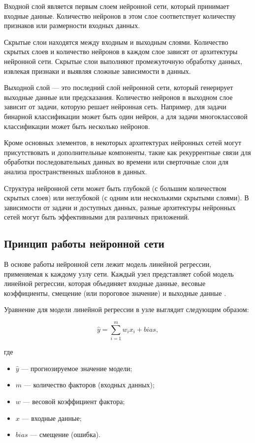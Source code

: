 Входной слой является первым слоем нейронной сети, который принимает входные данные. Количество нейронов в этом слое соответствует количеству признаков или размерности входных данных.

Скрытые слои находятся между входным и выходным слоями. Количество скрытых слоев и количество нейронов в каждом слое зависят от архитектуры нейронной сети. Скрытые слои выполняют промежуточную обработку данных, извлекая признаки и выявляя сложные зависимости в данных.

Выходной слой --- это последний слой нейронной сети, который генерирует выходные данные или предсказания. Количество нейронов в выходном слое зависит от задачи, которую решает нейронная сеть. Например, для задачи бинарной классификации может быть один нейрон, а для задачи многоклассовой классификации может быть несколько нейронов.

Кроме основных элементов, в некоторых архитектурах нейронных сетей могут присутствовать и дополнительные компоненты, такие как рекуррентные связи для обработки последовательных данных во времени или сверточные слои для анализа пространственных шаблонов в данных.

Структура нейронной сети может быть глубокой (с большим количеством скрытых слоев) или неглубокой (с одним или несколькими скрытыми слоями). В зависимости от задачи и доступных данных, разные архитектуры нейронных сетей могут быть эффективными для различных приложений.

\subsection{Принцип работы нейронной сети}

В основе работы нейронной сети лежит модель линейной регрессии, применяемая к каждому узлу сети. Каждый узел представляет собой модель линейной регрессии, которая объединяет входные данные, весовые коэффициенты, смещение (или пороговое значение) и выходные данные \cite{neuralnetworkswork}.

Уравнение для модели линейной регрессии в узле выглядит следующим образом:

\begin{equation}
\hat{y} = \sum_{i=1}^{m}w_ix_i + bias,
\end{equation}

где
\begin{itemize}
    \item $\hat{y}$ --- прогнозируемое значение модели;
    \item $m$ --- количество факторов (входных данных);
    \item $w$ --- весовой коэффициент фактора;
    \item $x$ --- входные данные;
    \item $bias$ --- смещение (ошибка).
\end{itemize}

